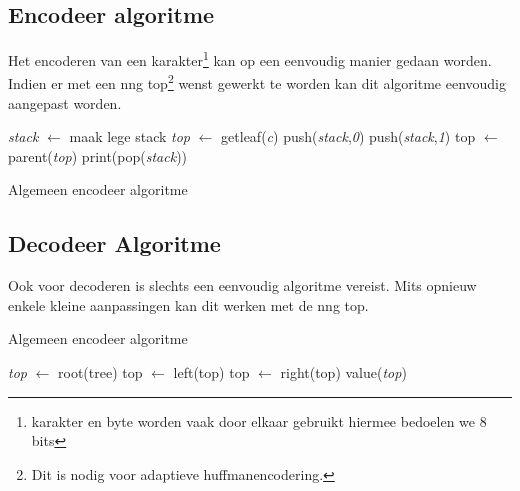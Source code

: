 \documentclass[twoside,twocolumn]{article}
\begin{document}
    \subsection{Encodeer algoritme}
     Het encoderen van een karakter\footnote{karakter en byte worden vaak door elkaar gebruikt hiermee bedoelen we 8 bits} kan op een eenvoudig manier gedaan worden. Indien er met een nng top\footnote{Dit is nodig voor adaptieve huffmanencodering.} wenst gewerkt te worden kan dit algoritme 
     eenvoudig aangepast worden. 
        \begin{algorithm}
            \begin{algorithmic}[1]
                    \State \textit{stack} $\gets$ maak lege stack
                    \State \textit{top} $\gets$ getleaf(\textit{c})
                    \State push(\textit{stack},\textit{0})
                    \Else
                    \State push(\textit{stack},\textit{1})
                    \EndIf
                    \State top $\gets$ parent(\textit{top})
                    \EndWhile
                    \State print(pop(\textit{stack}))
                    \EndWhile
                \EndProcedure
            \end{algorithmic}
            \caption{Algemeen encodeer algoritme}
                        \label{alg:decodeer}

        \end{algorithm}
    
    \subsection{Decodeer Algoritme}
    Ook voor decoderen is slechts een eenvoudig algoritme vereist.
    Mits opnieuw enkele kleine aanpassingen kan dit werken met de nng top.
        \begin{algorithm}
            \caption{Algemeen encodeer algoritme}
            \begin{algorithmic}[1]
                    \State \textit{top} $\gets$ root(tree) 
                    \State top $\gets$ left(top)
                    \Else
                    \State top $\gets$ right(top)
                    \EndIf
                    \EndWhile
                    \State \Return value(\textit{top})
                \EndProcedure
            \end{algorithmic}
            \label{alg:encodeer}
        \end{algorithm}
    
\end{document}
